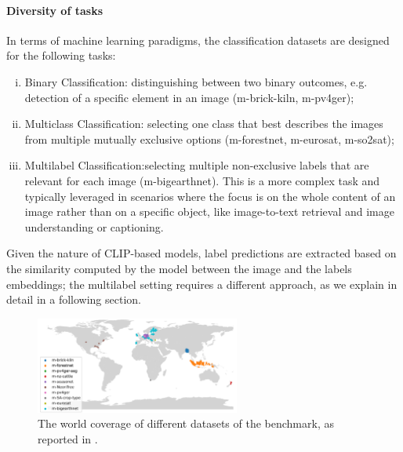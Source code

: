 \documentclass[a4paper, oneside, english]{sapthesis} %
\begin{document}
\paragraph{Diversity of tasks}

In terms of machine learning paradigms, the classification datasets are designed for the following tasks:
\begin{enumerate}[i)]
    \item Binary Classification: distinguishing between two binary outcomes, e.g. detection of a specific element in an image (m-brick-kiln, m-pv4ger);
    \item Multiclass Classification: selecting one class that best describes the images from multiple mutually exclusive options (m-forestnet, m-eurosat, m-so2sat);
    \item Multilabel Classification:selecting multiple non-exclusive labels that are relevant for each image (m-bigearthnet). This is a more complex task and typically leveraged in scenarios where the focus is on the whole content of an image rather than on a specific object, like image-to-text retrieval and image understanding or captioning. 
\end{enumerate}
Given the nature of CLIP-based models, label predictions are extracted based on the similarity computed by the model between the image and the labels embeddings; the multilabel setting requires a different approach, as we explain in detail in a following section.


\begin{figure}[h]
    \centering
    \includegraphics[width=0.6\textwidth]{img/geobench_world_coverage.png}
    \caption{The world coverage of different datasets of the benchmark, as reported in \cite{lacoste2023geo}.}
    \label{fig:geoworld}
\end{figure}  
\end{document}
